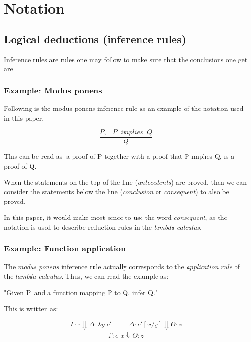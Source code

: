 
\chapter{Notation}

\section{Logical deductions (inference rules)}

Inference rules are rules one may follow to make sure that the conclusions one get are


\subsection{Example: Modus ponens}

Following is the modus ponens inference rule as an example of the 
notation used in this paper.

\begin{equation}
\dfrac{P, \;\;\; P \;\; implies \;\; Q}{Q}
\end{equation}

This can be read as; a proof of P together with a proof that P implies Q, is a proof of Q.

When the statements on the top of the line (\emph{antecedents}) are proved, then we can consider
the statements below the line (\emph{conclusion} or \emph{consequent}) to also be proved. 

In this paper, it would make most sence to use the word \emph{consequent}, as the notation is used to
describe reduction rules in the \emph{lambda calculus}. 

\subsection{Example: Function application}

The \emph{modus ponens} inference rule actually
corresponds to the \emph{application rule} of the \emph{lambda calculus}. 
Thus, we can read the example as:

\begin{center}
"Given P, and a function mapping P to Q, infer Q." 
\end{center}

This is written as:

\begin{equation}
\dfrac{\Gamma : e \Downarrow \Delta : \lambda y . e' \;\;\;\;\;\;\;\;\; \Delta : e' [x/y] \Downarrow \Theta : z }{ \Gamma : e \; x \Downarrow \Theta : z}
\end{equation}


